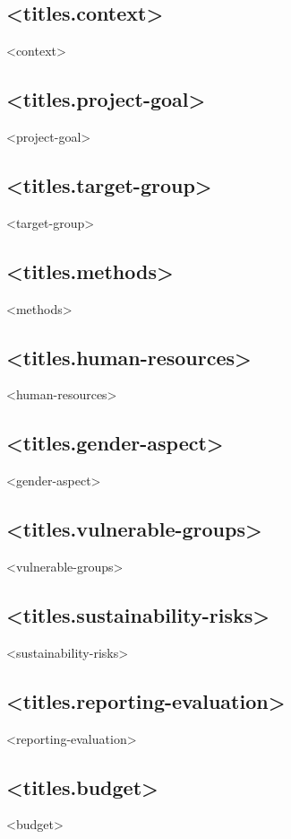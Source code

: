 \documentclass[twoside,a4paper]{article}
\begin{document}
		\subsection*{<titles.context>}
		    <context>

		\subsection*{<titles.project-goal>}
		    <project-goal>
		
		\subsection*{<titles.target-group>}
		    <target-group>
		
		\subsection*{<titles.methods>}
		    <methods>

		\subsection*{<titles.human-resources>}
		    <human-resources>
		
		\subsection*{<titles.gender-aspect>}
		    <gender-aspect>
		
		\subsection*{<titles.vulnerable-groups>}
		    <vulnerable-groups>
		
		\subsection*{<titles.sustainability-risks>}
		    <sustainability-risks>
		
		\subsection*{<titles.reporting-evaluation>}
		    <reporting-evaluation>
		
		\subsection*{<titles.budget>}
		    <budget>
		
\end{document}
